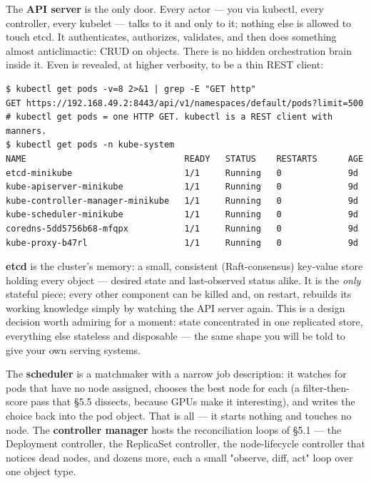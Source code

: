 The \textbf{API server} is the only door. Every actor — you via kubectl, every controller, every kubelet — talks to it and only to it; nothing else is allowed to touch etcd. It authenticates, authorizes, validates, and then does something almost anticlimactic: CRUD on objects. There is no hidden orchestration brain inside it. Even  is revealed, at higher verbosity, to be a thin REST client:

\begin{terminalbox}
\begin{Verbatim}[breaklines=true,breakanywhere=true,fontsize=\small,formatcom=\color{tbbtermfg},codes=\tbbcodeactive]
$ kubectl get pods -v=8 2>&1 | grep -E "GET http"
GET https://192.168.49.2:8443/api/v1/namespaces/default/pods?limit=500
# kubectl get pods = one HTTP GET. kubectl is a REST client with manners.
$ kubectl get pods -n kube-system
NAME                               READY   STATUS    RESTARTS      AGE
etcd-minikube                      1/1     Running   0             9d
kube-apiserver-minikube            1/1     Running   0             9d
kube-controller-manager-minikube   1/1     Running   0             9d
kube-scheduler-minikube            1/1     Running   0             9d
coredns-5dd5756b68-mfqpx           1/1     Running   0             9d
kube-proxy-b47rl                   1/1     Running   0             9d
\end{Verbatim}
\end{terminalbox}

\textbf{etcd} is the cluster's memory: a small, consistent (Raft-consensus) key-value store holding every object — desired state and last-observed status alike. It is the \textit{only} stateful piece; every other component can be killed and, on restart, rebuilds its working knowledge simply by watching the API server again. This is a design decision worth admiring for a moment: state concentrated in one replicated store, everything else stateless and disposable — the same shape you will be told to give your own serving systems.

The \textbf{scheduler} is a matchmaker with a narrow job description: it watches for pods that have no node assigned, chooses the best node for each (a filter-then-score pass that §5.5 dissects, because GPUs make it interesting), and writes the choice back into the pod object. That is all — it starts nothing and touches no node. The \textbf{controller manager} hosts the reconciliation loops of §5.1 — the Deployment controller, the ReplicaSet controller, the node-lifecycle controller that notices dead nodes, and dozens more, each a small "observe, diff, act" loop over one object type.

